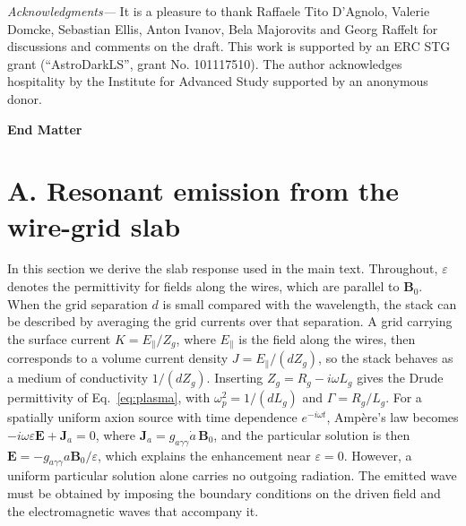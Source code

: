 \documentclass[
  aps,prl,reprint,superscriptaddress,
  amsmath,amssymb,floatfix,nofootinbib
]{revtex4-2}
\newcommand{\gagg}{g_{a\gamma\gamma}}
\begin{document}
\textit{Acknowledgments---}
It is a pleasure to thank Raffaele Tito D'Agnolo, Valerie Domcke, Sebastian Ellis, Anton Ivanov, Bela Majorovits and Georg Raffelt for discussions and comments on the draft. This work is supported by an ERC STG grant (``AstroDarkLS'', grant No. 101117510). The author acknowledges hospitality by the Institute for Advanced Study supported by an anonymous donor.




\clearpage
\onecolumngrid
\begin{center}{\large\bfseries End Matter}\end{center}
\twocolumngrid
\setcounter{equation}{0}
\renewcommand{\theequation}{A\arabic{equation}}
\renewcommand{\theHequation}{A.\arabic{equation}}

\section*{A. Resonant emission from the wire-grid slab}

In this section we derive the slab response used in the main text. Throughout, $\varepsilon$ denotes the permittivity for fields along the wires, which are parallel to $\mathbf B_0$. When the grid separation $d$ is small compared with the wavelength, the stack can be described by averaging the grid currents over that separation. A grid carrying the surface current $K=E_\parallel/Z_g$, where $E_\parallel$ is the field along the wires, then corresponds to a volume current density $J=E_\parallel/(dZ_g)$, so the stack behaves as a medium of conductivity $1/(dZ_g)$. Inserting $Z_g=R_g-i\omega L_g$ gives the Drude permittivity of Eq.~\eqref{eq:plasma}, with $\omega_p^2=1/(dL_g)$ and $\Gamma=R_g/L_g$. For a spatially uniform axion source with time dependence $e^{-i\omega t}$, Amp\`ere's law becomes $-i\omega\varepsilon\mathbf E+\mathbf J_a=0$, where $\mathbf J_a=\gagg\dot a\,\mathbf B_0$, and the particular solution is then $\mathbf E=-\gagg a\mathbf B_0/\varepsilon$, which explains the enhancement near $\varepsilon=0$. However, a uniform particular solution alone carries no outgoing radiation. The emitted wave must be obtained by imposing the boundary conditions on the driven field and the electromagnetic waves that accompany it.
\end{document}
